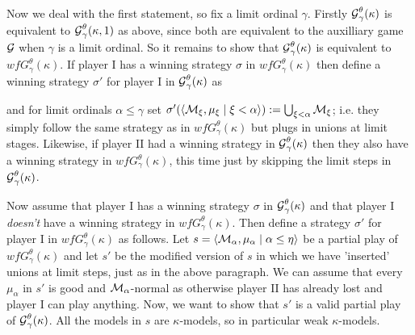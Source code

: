 \documentclass[../../main]{subfiles}
\begin{document}
{	\qquad Now we deal with the first statement, so fix a limit ordinal $\gamma$. Firstly $\operatorname{\mathcal G}_\gamma^\theta(\kappa)$ is equivalent to $\operatorname{\mathcal G}_\gamma^\theta(\kappa,1)$ as above, since both are equivalent to the auxilliary game $\operatorname{\mathcal G}$ when $\gamma$ is a limit ordinal. So it remains to show that $\operatorname{\mathcal G}_\gamma^\theta(\kappa)$ is equivalent to $wfG_\gamma^\theta(\kappa)$. If player I has a winning strategy $\sigma$ in $wfG_\gamma^\theta(\kappa)$ then define a winning strategy $\sigma'$ for player I in $\operatorname{\mathcal G}_\gamma^\theta(\kappa)$ as

	and for limit ordinals $\alpha\leq\gamma$ set $\sigma'(\langle \operatorname{\mathcal M}_\xi,\mu_\xi\mid\xi<\alpha\rangle):=\bigcup_{\xi<\alpha}\operatorname{\mathcal M}_\xi$; i.e. they simply follow the same strategy as in $wfG_\gamma^\theta(\kappa)$ but plugs in unions at limit stages. Likewise, if player II had a winning strategy in $\operatorname{\mathcal G}_\gamma^\theta(\kappa)$ then they also have a winning strategy in $wfG_\gamma^\theta(\kappa)$, this time just by skipping the limit steps in $\operatorname{\mathcal G}_\gamma^\theta(\kappa)$.

	\qquad Now assume that player I has a winning strategy $\sigma$ in $\operatorname{\mathcal G}_\gamma^\theta(\kappa)$ and that player I \textit{doesn't} have a winning strategy in $wfG_\gamma^\theta(\kappa)$. Then define a strategy $\sigma'$ for player I in $wfG_\gamma^\theta(\kappa)$ as follows. Let $s=\langle \operatorname{\mathcal M}_\alpha,\mu_\alpha\mid\alpha\leq\eta\rangle$ be a partial play of $wfG_\gamma^\theta(\kappa)$ and let $s'$ be the modified version of $s$ in which we have 'inserted' unions at limit steps, just as in the above paragraph. We can assume that every $\mu_\alpha$ in $s'$ is good and $\operatorname{\mathcal M}_\alpha$-normal as otherwise player II has already lost and player I can play anything. Now, we want to show that $s'$ is a valid partial play of $\operatorname{\mathcal G}_\gamma^\theta(\kappa)$. All the models in $s$ are $\kappa$-models, so in particular weak $\kappa$-models.
	
	
	}
\end{document}
